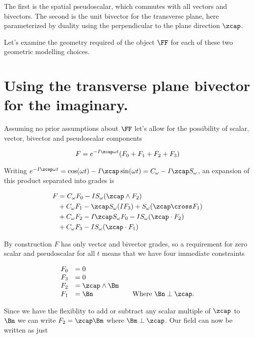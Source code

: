 The first is the spatial pseudoscalar, which commutes with all vectors and bivectors.  The second is the unit bivector for the transverse plane, here parameterized by duality using the perpendicular to the plane direction $\zcap$.

Let's examine the geometry required of the object $\FF$ for each of these two geometric modelling choices.

\section{Using the transverse plane bivector for the imaginary.}

Assuming no prior assumptions about $\FF$ let's allow for the possibility of scalar, vector, bivector and pseudoscalar components 

\begin{align}\label{eqn:foo5}
F = e^{-I\zcap \omega t} ( F_0 + F_1 + F_2 + F_3 )
\end{align}

Writing $e^{-I\zcap \omega t} = \cos(\omega t) -I \zcap \sin(\omega t) = C_\omega -I \zcap S_\omega$, an expansion of this product separated into grades is

\begin{align*}
F &= 
  C_\omega F_0 - I S_\omega (\zcap \wedge F_2) \\
&+ C_\omega F_1 - \zcap S_\omega (I F_3) + S_\omega (\zcap \cross F_1)  \\
&+ C_\omega F_2 - I \zcap S_\omega F_0 - I S_\omega (\zcap \cdot F_2) \\
&+ C_\omega F_3 - I S_\omega (\zcap \cdot F_1)
\end{align*}

By construction $F$ has only vector and bivector grades, so a requirement for zero scalar and pseudoscalar for all $t$ means that we have four immediate constraints

\begin{align*}
\begin{array}{l l l}
F_0 &= 0 & \\
F_3 &= 0 & \\
F_2 &= \zcap \wedge \Bm \\
F_1 &= \Bn & \quad \mbox{Where $\Bn \perp \zcap$.} \\
\end{array}
\end{align*}

Since we have the flexiblity to add or subtract any scalar multiple of $\zcap$ to $\Bm$ we can write $F_2 = \zcap \Bm$ where $\Bm \perp \zcap$.  Our field can now be written as just

